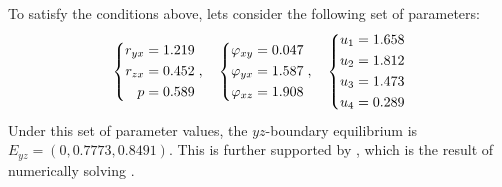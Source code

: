 To satisfy the conditions above, lets consider the following set of parameters:
\begin{equation}\label{params:boundary-yz}
    \begin{dcases}
        \begin{aligned}
            r_{yx} &= 1.219\\
            r_{zx} &= 0.452\\
            p &= 0.589
        \end{aligned}
    \end{dcases},\quad 
    \begin{dcases}
        \begin{aligned}
            \varphi_{xy} &= 0.047\\
            \varphi_{yx} &= 1.587\\
            \varphi_{xz} &= 1.908
        \end{aligned}
    \end{dcases},\quad
    \begin{dcases}
        \begin{aligned}
            u_1 &= 1.658\\
            u_2 &= 1.812\\
            u_3 &= 1.473\\
            u_4 &= 0.289
        \end{aligned}
    \end{dcases}
\end{equation}
Under this set of parameter values, the $yz$-boundary equilibrium is $E_{yz}=(0,0.7773,0.8491)$. This is further supported by , which is the result of numerically solving .

